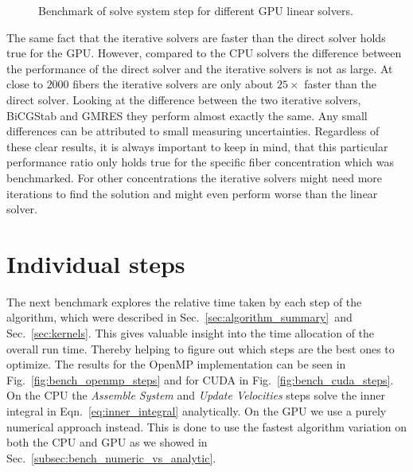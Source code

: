 \begin{figure}[!htbp]
  \centering
  \caption{Benchmark of solve system step for different GPU linear solvers.}
  \label{fig:bench_cuda_solvers}
\end{figure}

The same fact that the iterative solvers are faster than the direct solver holds true for the GPU. However, compared to the CPU solvers the difference between the performance of the direct solver and the iterative solvers is not as large. At close to $2000$ fibers the iterative solvers are only about $25×$ faster than the direct solver. Looking at the difference between the two iterative solvers, BiCGStab and GMRES they perform almost exactly the same. Any small differences can be attributed to small measuring uncertainties. Regardless of these clear results, it is always important to keep in mind, that this particular performance ratio only holds true for the specific fiber concentration which was benchmarked. For other concentrations the iterative solvers might need more iterations to find the solution and might even perform worse than the linear solver.

\section{Individual steps}

The next benchmark explores the relative time taken by each step of the algorithm, which were described in Sec.~\ref{sec:algorithm_summary}~and Sec.~\ref{sec:kernels}. This gives valuable insight into the time allocation of the overall run time. Thereby helping to figure out which steps are the best ones to optimize. The results for the OpenMP implementation can be seen in Fig.~\ref{fig:bench_openmp_steps} and for CUDA in Fig.~\ref{fig:bench_cuda_steps}. On the CPU the \emph{Assemble System} and \emph{Update Velocities} steps solve the inner integral in Eqn.~\eqref{eq:inner_integral} analytically. On the GPU we use a purely numerical approach instead. This is done to use the fastest algorithm variation on both the CPU and GPU as we showed in Sec.~\ref{subsec:bench_numeric_vs_analytic}.

